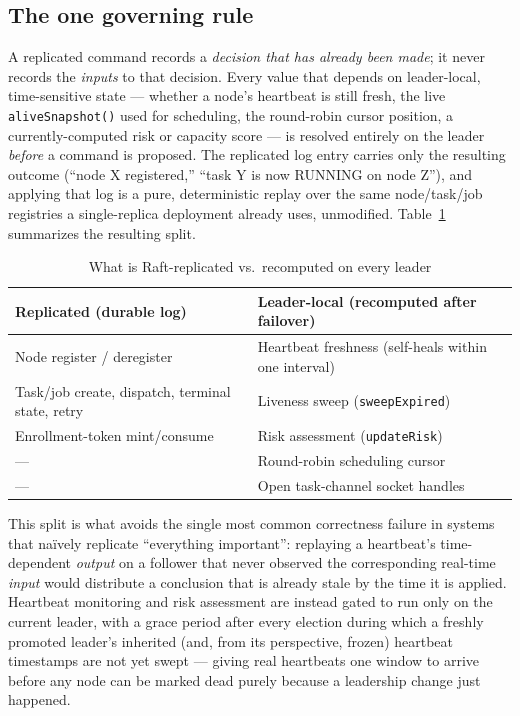 \documentclass[conference]{IEEEtran}
\begin{document}
\subsection{The one governing rule}

A replicated command records a \emph{decision that has already been made}; it never records the
\emph{inputs} to that decision. Every value that depends on leader-local, time-sensitive state —
whether a node's heartbeat is still fresh, the live \texttt{aliveSnapshot()} used for scheduling, the
round-robin cursor position, a currently-computed risk or capacity score — is resolved entirely on the
leader \emph{before} a command is proposed. The replicated log entry carries only the resulting
outcome (``node X registered,'' ``task Y is now RUNNING on node Z''), and applying that log is a pure,
deterministic replay over the same node/task/job registries a single-replica deployment already uses,
unmodified. Table~\ref{tab:replication} summarizes the resulting split.

\begin{table}[t]
\caption{What is Raft-replicated vs.\ recomputed on every leader}
\label{tab:replication}
\centering
\small
\begin{tabular}{@{}p{3.9cm}p{4.0cm}@{}}
\toprule
\textbf{Replicated (durable log)} & \textbf{Leader-local (recomputed after failover)} \\
\midrule
Node register / deregister & Heartbeat freshness (self-heals within one interval) \\
Task/job create, dispatch, terminal state, retry & Liveness sweep (\texttt{sweepExpired}) \\
Enrollment-token mint/consume & Risk assessment (\texttt{updateRisk}) \\
--- & Round-robin scheduling cursor \\
--- & Open task-channel socket handles \\
\bottomrule
\end{tabular}
\end{table}

This split is what avoids the single most common correctness failure in systems that na\"ively
replicate ``everything important'': replaying a heartbeat's time-dependent \emph{output} on a follower
that never observed the corresponding real-time \emph{input} would distribute a conclusion that is
already stale by the time it is applied. Heartbeat monitoring and risk assessment are instead gated to
run only on the current leader, with a grace period after every election during which a freshly
promoted leader's inherited (and, from its perspective, frozen) heartbeat timestamps are not yet swept
— giving real heartbeats one window to arrive before any node can be marked dead purely because a
leadership change just happened.
\end{document}

